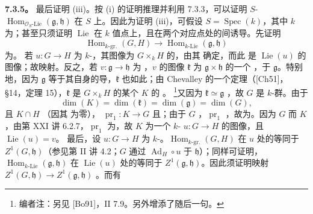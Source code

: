 \textbf{7.3.5。} 最后证明 (iii)。按 (i) 的证明推理并利用 7.3.3，可以证明 $S$- $\operatorname{Hom}_{\mathscr O_S\text{-Lie}}(\mathfrak g,\mathfrak h)$ 在 $S$ 上。因此为证明 (iii)，可假设 $S=\operatorname{Spec}(k)$，其中 $k$ 为；甚至只须证明 $\operatorname{Lie}$ 在 $k$ 值点上，且在两个对应点处的间诱导。先证明
\[\operatorname{Hom}_{k\text{-gr.}}(G,H)\longrightarrow\operatorname{Hom}_{k\text{-Lie}}(\mathfrak g,\mathfrak h)\]
为。
若 $u:G\to H$ 为 $k$-，其图像为 $G\times_kH$ 的，由其 确定，而此 是 $\operatorname{Lie}(u)$ 的图像；故映射。反之，若 $v:\mathfrak g\to\mathfrak h$ 为 ，$v$ 的图像 $\mathfrak k$ 为 $\mathfrak g\times\mathfrak h$ 的一个 ，于 $\mathfrak g$。特别地，因为 $\mathfrak g$ 等于其自身的导，$\mathfrak k$ 也如此；由 Chevalley 的一个定理（[Ch51]，\S 14，定理 15），$\mathfrak k$ 是 $G\times_kH$ 的某个 $K$ 的 。
\footnote{编者注：另见 [Bo91]，II 7.9。另外增添了随后一句。}又因为 $\mathfrak k\simeq\mathfrak g$ ，故 $G$ 是 $k$-群。由于
\[\dim(K)=\dim(\mathfrak k)=\dim(\mathfrak g)=\dim(G),\]
且 $K\cap H$ （因其 为零）， $\operatorname{pr}_1:K\to G$ 且；由于 $G$ ，$\operatorname{pr}_1$ ，故为。因为 $G$ 而 $K$ ，由第 XXI 讲 6.2.7，$\operatorname{pr}_1$ 为，故 $K$ 为一个 $k$- $u:G\to H$ 的图像，且 $\operatorname{Lie}(u)=v$。
最后，设 $u:G\to H$ 为 $k$-。$\operatorname{Hom}_{k\text{-gr.}}(G,H)$ 在 $u$ 处的等同于 $Z^1(G,\mathfrak h)$（参见第 II 讲 4.2；$G$ 通过 $\operatorname{Ad}_H\circ u$ 于 $\mathfrak h$）；同样可证明，$\operatorname{Hom}_{k\text{-Lie}}(\mathfrak g,\mathfrak h)$ 在 $\operatorname{Lie}(u)$ 处的等同于 $Z^1(\mathfrak g,\mathfrak h)$。因此须证明映射 $Z^1(G,\mathfrak h)\to Z^1(\mathfrak g,\mathfrak h)$ 。而有
